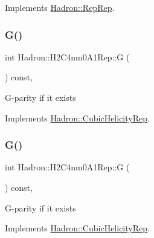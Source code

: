 Implements \mbox{\hyperlink{structHadron_1_1RepRep_a92c8802e5ed7afd7da43ccfd5b7cd92b}{Hadron\+::\+Rep\+Rep}}.

\mbox{\label{structHadron_1_1H2C4nm0A1Rep_aec6a6ccbc60586777420574c4047446b}} 
\subsubsection{\texorpdfstring{G()}{G()}\hspace{0.1cm}{\footnotesize\ttfamily [1/3]}}
{\footnotesize\ttfamily int Hadron\+::\+H2\+C4nm0\+A1\+Rep\+::G (\begin{DoxyParamCaption}{ }\end{DoxyParamCaption}) const\hspace{0.3cm}{\ttfamily [inline]}, {\ttfamily [virtual]}}

G-\/parity if it exists 

Implements \mbox{\hyperlink{structHadron_1_1CubicHelicityRep_a50689f42be1e6170aa8cf6ad0597018b}{Hadron\+::\+Cubic\+Helicity\+Rep}}.

\mbox{\label{structHadron_1_1H2C4nm0A1Rep_aec6a6ccbc60586777420574c4047446b}} 
\subsubsection{\texorpdfstring{G()}{G()}\hspace{0.1cm}{\footnotesize\ttfamily [2/3]}}
{\footnotesize\ttfamily int Hadron\+::\+H2\+C4nm0\+A1\+Rep\+::G (\begin{DoxyParamCaption}{ }\end{DoxyParamCaption}) const\hspace{0.3cm}{\ttfamily [inline]}, {\ttfamily [virtual]}}

G-\/parity if it exists 

Implements \mbox{\hyperlink{structHadron_1_1CubicHelicityRep_a50689f42be1e6170aa8cf6ad0597018b}{Hadron\+::\+Cubic\+Helicity\+Rep}}.

\mbox{\label{structHadron_1_1H2C4nm0A1Rep_aec6a6ccbc60586777420574c4047446b}} 
